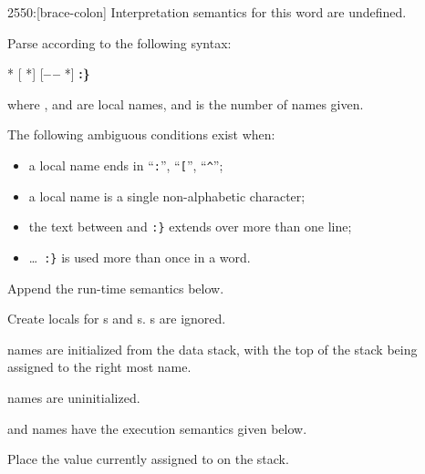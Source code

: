 \enlargethispage{6ex}
\begin{worddef}[b:]{2550}{\brace:}[brace-colon]%
\interpret
	Interpretation semantics for this word are undefined.

\compile

	Parse  according to the following syntax:
	\begin{center}
		 * [\textbf{\textbar} *] [\textbf{--\,--} *] \textbf{:\}}
	\end{center}
	where ,  and  are local names, and
	 is the number of  names given.

	The following ambiguous conditions exist when:
	\begin{itemize}
	\item a local name ends in ``\texttt{:}'', ``\texttt{[}'', ``\texttt{\textasciicircum}'';
	\item a local name is a single non-alphabetic character;
	\item the text between  and \texttt{:\}} extends
			over more than one line;
	\item {} \ldots\ \texttt{:\}} is used more than once in a word.
	\end{itemize}

	Append the run-time semantics below. 

\runtime

	Create locals for s and s. s are ignored.

	\begin{list}{}{
		\setlength{\leftmargin}{2.6em}
		\setlength{\labelwidth}{2.4em}
	}
	\item[\arg{arg}] names are initialized from the data stack, with the
		top of the stack being assigned to the right most  name.

	\item[\arg{val}] names are uninitialized.
	\end{list}

	 and  names have the execution semantics
		given below.

\execute[name]

	Place the value currently assigned to  on the stack.


\end{worddef}
